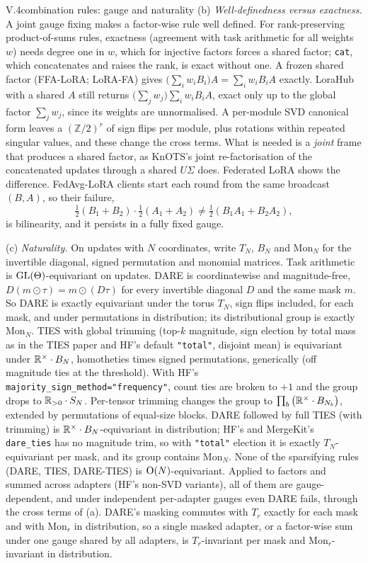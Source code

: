\begin{proposition}{V.4}{combination rules: gauge and naturality}
(b) \emph{Well-definedness versus exactness.} A joint gauge fixing makes a factor-wise rule well defined. For
rank-preserving product-of-sums rules, exactness (agreement with task arithmetic for all weights $w$) needs degree one
in $w$, which for injective factors forces a shared factor; \texttt{cat}, which concatenates and raises the rank, is
exact without one. A frozen shared factor (FFA-LoRA; LoRA-FA) gives $\big(\sum_iw_iB_i\big)A=\sum_iw_iB_iA$ exactly.
LoraHub with a shared $A$ still returns $\big(\sum_jw_j\big)\sum_iw_iB_iA$, exact only up to the global factor
$\sum_jw_j$, since its weights are unnormalised. A per-module SVD canonical form leaves a $(\mathbb Z/2)^r$ of sign
flips per module, plus rotations within repeated singular values, and these change the cross terms. What is needed is
a \emph{joint} frame that produces a shared factor, as KnOTS's joint re-factorisation of the concatenated updates
through a shared $U\Sigma$ does. Federated LoRA shows the difference. FedAvg-LoRA clients start each round from the
same broadcast $(B,A)$, so their failure,
\[\tfrac12(B_1+B_2)\cdot\tfrac12(A_1+A_2)\ne\tfrac12(B_1A_1+B_2A_2),\]
is bilinearity, and it persists in a fully fixed gauge.

(c) \emph{Naturality.} On updates with $N$ coordinates, write $T_N$, $B_N$ and $\mathrm{Mon}_N$ for the invertible
diagonal, signed permutation and monomial matrices. Task arithmetic is $\mathrm{GL}(\Theta)$-equivariant on updates. DARE is
coordinatewise and magnitude-free, $D(m\odot\tau)=m\odot(D\tau)$ for every invertible diagonal $D$ and the same mask
$m$. So DARE is exactly equivariant under the torus $T_N$, sign flips included, for each mask, and under permutations in
distribution; its distributional group is exactly $\mathrm{Mon}_N$. TIES with global trimming (top-$k$ magnitude, sign
election by total mass as in the TIES paper and HF's default \texttt{"total"}, disjoint mean) is equivariant under
$\mathbb{R}^\times\cdot B_N$, homotheties times signed permutations, generically (off magnitude ties at the threshold). With
HF's \texttt{majority\_\allowbreak sign\_\allowbreak method="frequency"}, count ties are broken to $+1$ and the group
drops to $\mathbb{R}_{>0}\cdot S_N$. Per-tensor trimming changes the group to $\prod_b\big(\mathbb{R}^\times\cdot B_{N_b}\big)$,
extended by permutations of equal-size blocks. DARE followed by full TIES (with trimming) is
$\mathbb{R}^\times\cdot B_N$-equivariant in distribution; HF's and MergeKit's \texttt{dare\_ties} has no magnitude trim, so
with \texttt{"total"} election it is exactly $T_N$-equivariant per mask, and its group contains $\mathrm{Mon}_N$. None
of the sparsifying rules (DARE, TIES, DARE-TIES) is $\mathrm{O}(N)$-equivariant. Applied to factors and summed across adapters
(HF's non-SVD variants), all of them are gauge-dependent, and under independent per-adapter gauges even DARE fails,
through the cross terms of (a). DARE's masking commutes with $T_r$ exactly for each mask and with $\mathrm{Mon}_r$ in
distribution, so a single masked adapter, or a factor-wise sum under one gauge shared by all adapters, is
$T_r$-invariant per mask and $\mathrm{Mon}_r$-invariant in distribution.
\end{proposition}

